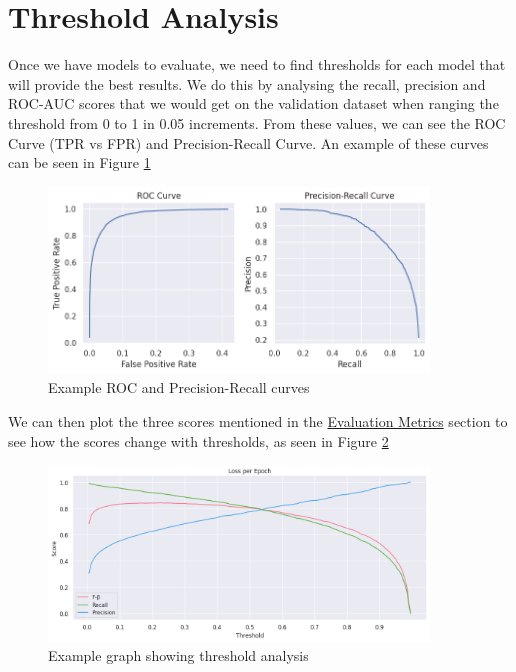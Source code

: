 \section{Threshold Analysis}
\label{threshold}

Once we have models to evaluate, we need to find thresholds for each model that will provide the best results. We do this by analysing the recall, precision and ROC-AUC scores that we would get on the validation dataset when ranging the threshold from 0 to 1 in 0.05 increments. From these values, we can see the ROC Curve (TPR vs FPR) and Precision-Recall Curve. An example of these curves can be seen in Figure \ref{fig:curves}

\begin{figure}[H]
    \centering
    \includegraphics[width=0.9\textwidth]{graphs/curves.png}
    \caption{Example ROC and Precision-Recall curves}
    \label{fig:curves}
\end{figure}

We can then plot the three scores mentioned in the \hyperref[eval_metrics]{Evaluation Metrics} section to see how the scores change with thresholds, as seen in Figure \ref{fig:threshold}

\begin{figure}[H]
    \centering
    \includegraphics[width=0.9\textwidth]{graphs/training/example_curves.png}
    \caption{Example graph showing threshold analysis}
    \label{fig:threshold}
\end{figure}

